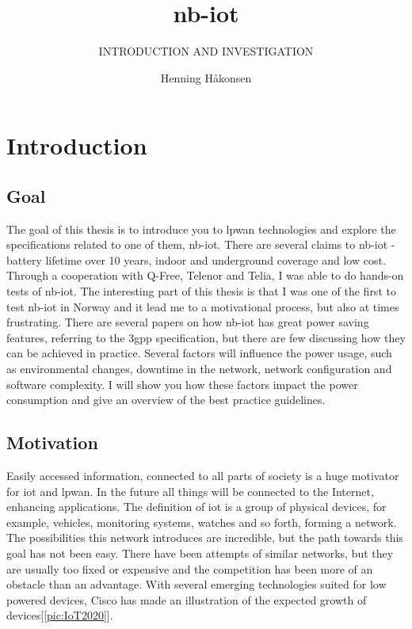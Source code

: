\documentclass[USenglish]{ifimaster}  %
\title{\acrlong{nb-iot}}
\subtitle{INTRODUCTION AND INVESTIGATION}
\author{Henning Håkonsen}
\begin{document}
\frontmatter

\duoforside[dept={Department of Informatics},   %
  program={Network and system administration},  %
  long]                                        %

\tableofcontents

\newpage
\lstlistoflistings

\newpage
\listoffigures

\newpage
\listoftables

\cleardoublepage


\cleardoublepage


\mainmatter{}

\chapter{Introduction}
\section{Goal}
The goal of this thesis is to introduce you to \acrfull{lpwan} technologies and explore the specifications related to one of them, \acrfull{nb-iot}. There are several claims to \acrshort{nb-iot} - battery lifetime over 10 years, indoor and underground coverage and low cost. Through a cooperation with Q-Free, Telenor and Telia, I was able to do hands-on tests of \acrshort{nb-iot}. The interesting part of this thesis is that I was one of the first to test \acrshort{nb-iot} in Norway and it lead me to a motivational process, but also at times frustrating. There are several papers on how \acrshort{nb-iot} has great power saving features, referring to the \acrfull{3gpp} specification, but there are few discussing how they can be achieved in practice. Several factors will influence the power usage, such as environmental changes, downtime in the network, network configuration and software complexity. I will show you how these factors impact the power consumption and give an overview of the best practice guidelines.

\section{Motivation}
Easily accessed information, connected to all parts of society is a huge motivator for \acrfull{iot} and \acrshort{lpwan}. In the future all things will be connected to the Internet, enhancing applications. The definition of \acrshort{iot} is a group of physical devices, for example, vehicles, monitoring systems, watches and so forth, forming a network. The possibilities this network introduces are incredible, but the path towards this goal has not been easy. There have been attempts of similar networks, but they are usually too fixed or expensive and the competition has been more of an obstacle than an advantage. With several emerging technologies suited for low powered devices, Cisco has made an illustration of the expected growth of devices[\vref{pic:IoT2020}].
\end{document}
